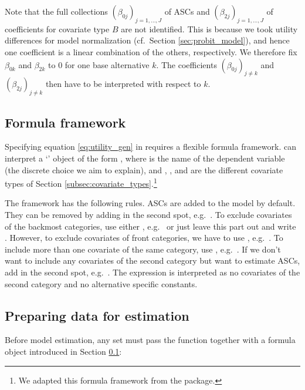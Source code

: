 \documentclass[article,shortnames]{jss}
\newcommand{\class}[1]{`\code{#1}'}
\newcommand{\fct}[1]{\code{#1()}}
\begin{document}
Note that the full collections $(\beta_{0j})_{j=1,\dots,J}$ of ASCs and $(\beta_{2j})_{j=1,\dots,J}$ of coefficients for covariate type $B$ are not identified. This is because we took utility differences for model normalization (cf.\ Section \ref{sec:probit_model}), and hence one coefficient is a linear combination of the others, respectively. We therefore fix $\beta_{0k}$ and $\beta_{2k}$ to 0 for one base alternative $k$. The coefficients $(\beta_{0j})_{j\neq k}$ and $(\beta_{2j})_{j\neq k}$ then have to be interpreted with respect to $k$.

\subsection{Formula framework} \label{subsec:formula}

Specifying equation \eqref{eq:utility_gen} in  requires a flexible formula framework.  can interpret a \class{formula} object of the form , where  is the name of the dependent variable (the discrete choice we aim to explain), and , , and  are the different covariate types of Section \ref{subsec:covariate_types}.\footnote{We adapted this formula framework from the  package.}

The framework has the following rules. ASCs are added to the model by default. They can be removed by adding  in the second spot, e.g.\ . To exclude covariates of the backmost categories, use either , e.g.\  or just leave this part out and write . However, to exclude covariates of front categories, we have to use , e.g.\ . To include more than one covariate of the same category, use \code{+}, e.g.\ . If we don't want to include any covariates of the second category but want to estimate ASCs, add  in the second spot, e.g.\ . The expression  is interpreted as no covariates of the second category and no alternative specific constants.

\subsection{Preparing data for estimation} \label{subsec:prepare_data}

Before model estimation, any  set must pass the \fct{prepare\_data} function together with a formula object  introduced in Section \ref{subsec:formula}:
\end{document}
